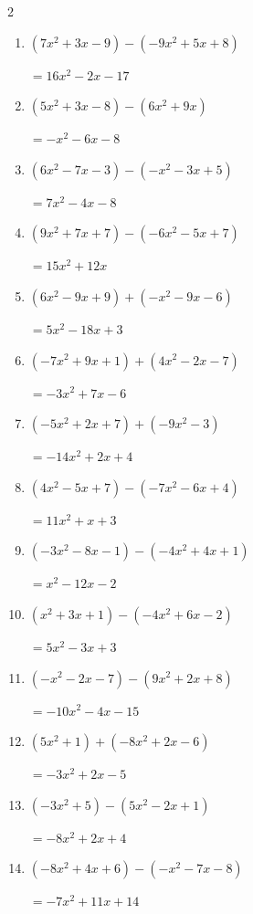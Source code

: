 \begin{multicols}{2}
\begin{enumerate}
        $=-2x^{2}-3x+16$

  \item $(7x^{2}+3x-9)-(-9x^{2}+5x+8)$

        $=16x^{2}-2x-17$

  \item $(5x^{2}+3x-8)-(6x^{2}+9x)$

        $=-x^{2}-6x-8$

  \item $(6x^{2}-7x-3)-(-x^{2}-3x+5)$

        $=7x^{2}-4x-8$

  \item $(9x^{2}+7x+7)-(-6x^{2}-5x+7)$

        $=15x^{2}+12x$

  \item $(6x^{2}-9x+9)+(-x^{2}-9x-6)$

        $=5x^{2}-18x+3$

  \item $(-7x^{2}+9x+1)+(4x^{2}-2x-7)$

        $=-3x^{2}+7x-6$

  \item $(-5x^{2}+2x+7)+(-9x^{2}-3)$

        $=-14x^{2}+2x+4$

  \item $(4x^{2}-5x+7)-(-7x^{2}-6x+4)$

        $=11x^{2}+x+3$

  \item $(-3x^{2}-8x-1)-(-4x^{2}+4x+1)$

        $=x^{2}-12x-2$

  \item $(x^{2}+3x+1)-(-4x^{2}+6x-2)$

        $=5x^{2}-3x+3$

  \item $(-x^{2}-2x-7)-(9x^{2}+2x+8)$

        $=-10x^{2}-4x-15$

  \item $(5x^{2}+1)+(-8x^{2}+2x-6)$

        $=-3x^{2}+2x-5$

  \item $(-3x^{2}+5)-(5x^{2}-2x+1)$

        $=-8x^{2}+2x+4$

  \item $(-8x^{2}+4x+6)-(-x^{2}-7x-8)$

        $=-7x^{2}+11x+14$


\end{enumerate}
\end{multicols}
